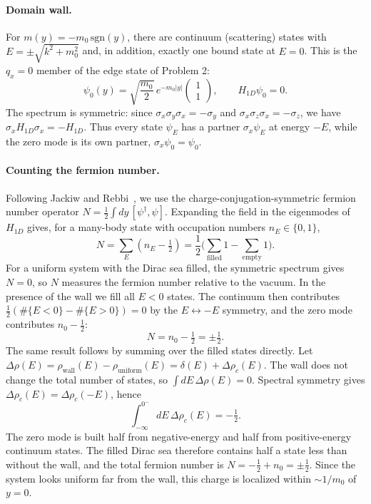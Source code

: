\documentclass{article}
\begin{document}
    \paragraph{Domain wall.} For $m(y) = -m_0\,\mathrm{sgn}(y)$, there are continuum (scattering) states with $E = \pm\sqrt{k^2 + m_0^2}$ and, in addition, exactly one bound state at $E=0$. This is the $q_x=0$ member of the edge state of Problem 2:
    \begin{equation}
        \psi_0(y) = \sqrt{\frac{m_0}{2}}\, e^{-m_0|y|}\begin{pmatrix} 1 \\ 1 \end{pmatrix}, \qquad H_{1D}\psi_0 = 0.
    \end{equation}
    The spectrum is symmetric: since $\sigma_x\sigma_y\sigma_x = -\sigma_y$ and $\sigma_x\sigma_z\sigma_x = -\sigma_z$, we have $\sigma_x H_{1D} \sigma_x = -H_{1D}$. Thus every state $\psi_E$ has a partner $\sigma_x\psi_E$ at energy $-E$, while the zero mode is its own partner, $\sigma_x\psi_0 = \psi_0$.

    \paragraph{Counting the fermion number.} Following Jackiw and Rebbi~\cite{JR}, we use the charge-conjugation-symmetric fermion number operator $N = \frac{1}{2}\int dy\, [\psi^\dagger, \psi]$. Expanding the field in the eigenmodes of $H_{1D}$ gives, for a many-body state with occupation numbers $n_E \in \{0,1\}$,
    \begin{equation}
        N = \sum_E \left(n_E - \tfrac{1}{2}\right) = \frac{1}{2}\Big(\sum_{\text{filled}} 1 - \sum_{\text{empty}} 1\Big).
    \end{equation}
    For a uniform system with the Dirac sea filled, the symmetric spectrum gives $N=0$, so $N$ measures the fermion number relative to the vacuum. In the presence of the wall we fill all $E<0$ states. The continuum then contributes $\frac{1}{2}\left(\#\{E<0\} - \#\{E>0\}\right) = 0$ by the $E \leftrightarrow -E$ symmetry, and the zero mode contributes $n_0 - \frac{1}{2}$:
    \begin{equation}
        N = n_0 - \tfrac{1}{2} = \pm\tfrac{1}{2}.
    \end{equation}
    The same result follows by summing over the filled states directly. Let $\Delta\rho(E) = \rho_{\text{wall}}(E) - \rho_{\text{uniform}}(E) = \delta(E) + \Delta\rho_c(E)$. The wall does not change the total number of states, so $\int dE\, \Delta\rho(E) = 0$. Spectral symmetry gives $\Delta\rho_c(E) = \Delta\rho_c(-E)$, hence
    \begin{equation}
        \int_{-\infty}^{0^-} dE\, \Delta\rho_c(E) = -\tfrac{1}{2}.
    \end{equation}
    The zero mode is built half from negative-energy and half from positive-energy continuum states. The filled Dirac sea therefore contains half a state less than without the wall, and the total fermion number is $N = -\frac{1}{2} + n_0 = \pm\frac{1}{2}$. Since the system looks uniform far from the wall, this charge is localized within $\sim 1/m_0$ of $y=0$.
\end{document}
